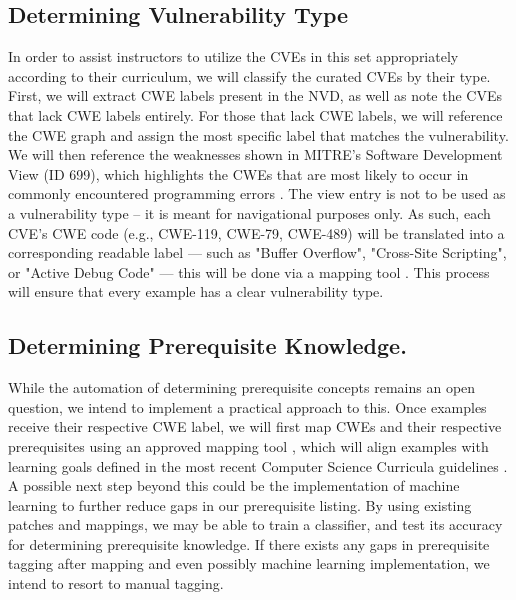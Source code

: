 \subsection{Determining Vulnerability Type}
In order to assist instructors to utilize the CVEs in this set appropriately according to their curriculum, we will classify the curated CVEs by their type. First, we will extract CWE labels present in the NVD, as well as note the CVEs that lack CWE labels entirely. For those that lack CWE labels, we will reference the CWE graph and assign the most specific label that matches the vulnerability. We will then reference the weaknesses shown in MITRE's Software Development View (ID 699), which highlights the CWEs that are most likely to occur in commonly encountered programming errors \cite{cweswview}. The view entry is not to be used as a vulnerability type -- it is meant for navigational purposes only. As such, each CVE's CWE code (e.g., CWE-119, CWE-79, CWE-489) will be translated into a corresponding readable label — such as "Buffer Overflow", "Cross-Site Scripting", or "Active Debug Code" — this will be done via a mapping tool \cite{Chen_CS_Topic-CWE-CVE_Mapping_2025}. This process will ensure that every example has a clear vulnerability type.
\subsection{Determining Prerequisite Knowledge.}
While the automation of determining prerequisite concepts remains an open question, we intend to implement a practical approach to this. Once examples receive their respective CWE label, we will first map  CWEs and their respective prerequisites using an approved mapping tool \cite{Chen_CS_Topic-CWE-CVE_Mapping_2025}, which will align examples with learning goals defined in the most recent Computer Science Curricula guidelines \cite{cscurriculum2023}. A possible next step beyond this could be the implementation of machine learning to further reduce gaps in our prerequisite listing. By using existing patches and mappings, we may be able to train a classifier, and test its accuracy for determining prerequisite knowledge. If there exists any gaps in prerequisite tagging after mapping and even possibly machine learning implementation, we intend to resort to manual tagging.

